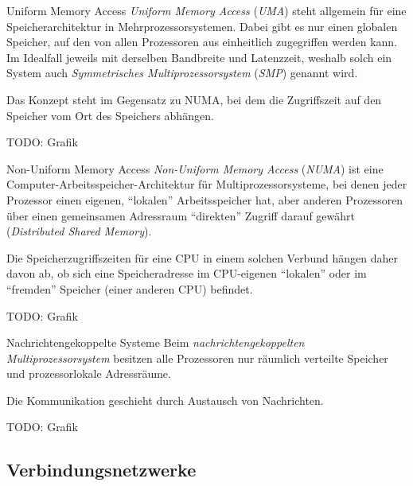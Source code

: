 \begin{defi}{Uniform Memory Access}
    \emph{Uniform Memory Access} (\emph{UMA}) steht allgemein für eine Speicherarchitektur in Mehrprozessorsystemen.
    Dabei gibt es nur einen globalen Speicher, auf den von allen Prozessoren aus einheitlich zugegriffen werden kann.
    Im Idealfall jeweils mit derselben Bandbreite und Latenzzeit, weshalb solch ein System auch \emph{Symmetrisches Multiprozessorsystem} (\emph{SMP}) genannt wird.
    
    Das Konzept steht im Gegensatz zu NUMA, bei dem die Zugriffszeit auf den Speicher vom Ort des Speichers abhängen.
    
    TODO: Grafik
\end{defi}

\begin{defi}{Non-Uniform Memory Access}
    \emph{Non-Uniform Memory Access} (\emph{NUMA}) ist eine Computer-Arbeitsspeicher-Architektur für Multiprozessorsysteme, bei denen jeder Prozessor einen eigenen, \enquote{lokalen} Arbeitsspeicher hat, aber anderen Prozessoren über einen gemeinsamen Adressraum \enquote{direkten} Zugriff darauf gewährt (\emph{Distributed Shared Memory}).
    
    Die Speicherzugriffszeiten für eine CPU in einem solchen Verbund hängen daher davon ab, ob sich eine Speicheradresse im CPU-eigenen \enquote{lokalen} oder im \enquote{fremden} Speicher (einer anderen CPU) befindet.
    
    TODO: Grafik
\end{defi}

\begin{defi}{Nachrichtengekoppelte Systeme}
    Beim \emph{nachrichtengekoppelten Multiprozessorsystem} besitzen alle Prozessoren nur räumlich verteilte Speicher und prozessorlokale Adressräume.
    
    Die Kommunikation geschieht durch Austausch von Nachrichten.
    
    TODO: Grafik
\end{defi}

\subsection{Verbindungsnetzwerke}

